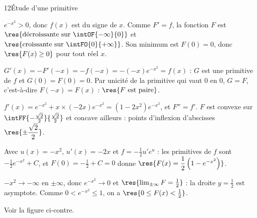 \begin{corrige}{12}{Étude d'une primitive}
\begin{questions}
  \item $e^{-x^{2}}>0$, donc $f(x)$ est du signe de $x$. Comme $F'=f$, la fonction $F$ est $\res{\text{décroissante sur }\intOF{-\infty}{0}}$
    et $\res{\text{croissante sur }\intFO{0}{+\infty}}$.
    Son minimum est $F(0)=0$, donc $\res{F(x)\geq0}$ pour tout réel $x$.
  \item $G'(x)=-F'(-x)=-f(-x)=-(-x)e^{-x^{2}}=f(x)$ : $G$ est une primitive de $f$ et $G(0)=F(0)=0$. Par unicité de la primitive
    qui vaut $0$ en $0$, $G=F$, c'est-à-dire $F(-x)=F(x)$ : $\res{F\text{ est paire}}$.
  \item $f'(x)=e^{-x^{2}}+x\times\left(-2x\right)e^{-x^{2}}=\left(1-2x^{2}\right)e^{-x^{2}}$, et $F''=f'$. $F$ est convexe sur
    $\intFF{-\frac{\sqrt2}{2}}{\frac{\sqrt2}{2}}$ et concave ailleurs : points d'inflexion d'abscisses $\res{\pm\dfrac{\sqrt2}{2}}$.
\end{questions}
\noindent
\begin{minipage}[t]{0.5\linewidth}\vspace{0pt}\raggedright
\begin{questions}[start=4]
  \item Avec $u(x)=-x^{2}$, $u'(x)=-2x$ et $f=-\frac12u'e^{u}$ : les primitives de $f$ sont $-\frac12e^{-x^{2}}+C$, et $F(0)=-\frac12+C=0$
    donne $\res{F(x)=\dfrac12\left(1-e^{-x^{2}}\right)}$.
  \item $-x^{2}\to-\infty$ en $\pm\infty$, donc $e^{-x^{2}}\to0$ et $\res{\lim_{\pm\infty}F=\frac12}$ : la droite $y=\frac12$ est asymptote.
    Comme $0<e^{-x^{2}}\leq1$, on a $\res{0\leq F(x)<\frac12}$.
  \item Voir la figure ci-contre.
\end{questions}
\end{minipage}\hfill
\begin{minipage}[t]{0.46\linewidth}\vspace{1mm}
\centering
{}\\[0.5mm]
\end{minipage}
\end{corrige}
